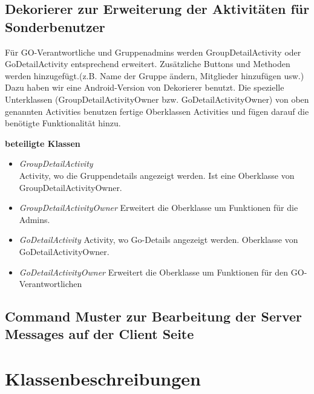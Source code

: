 \documentclass[11pt,a4paper]{article}
\begin{document}
\subsection{Dekorierer zur Erweiterung der Aktivitäten für Sonderbenutzer}
Für GO-Verantwortliche und Gruppenadmins werden GroupDetailActivity oder GoDetailActivity entsprechend erweitert. Zusätzliche Buttons und Methoden werden hinzugefügt.(z.B. Name der Gruppe ändern, Mitglieder hinzufügen usw.) Dazu haben wir eine Android-Version von Dekorierer benutzt. Die spezielle Unterklassen (GroupDetailActivityOwner bzw. GoDetailActivityOwner) von oben genannten Activities benutzen fertige Oberklassen Activities und fügen darauf die benötigte Funktionalität hinzu.

\textbf{beteiligte Klassen}
\begin{itemize}
\item \textit{GroupDetailActivity} \\
Activity, wo die Gruppendetails angezeigt werden. Ist eine Oberklasse von GroupDetailActivityOwner.
\item \textit{GroupDetailActivityOwner}
Erweitert die Oberklasse um Funktionen für die Admins.
\item \textit{GoDetailActivity}
Activity, wo Go-Details angezeigt werden. Oberklasse von GoDetailActivityOwner.
\item \textit{GoDetailActivityOwner}
Erweitert die Oberklasse um Funktionen für den GO-Verantwortlichen
\end{itemize}


\subsection{Command Muster zur Bearbeitung der Server Messages auf der Client Seite}


\newpage

\section{Klassenbeschreibungen}


\thispagestyle{empty}
\end{document}
